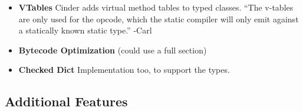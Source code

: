 \documentclass[a4paper,english,cleveref,autoref,thm-restate,anonymous,]{lipics-v2021}
\begin{document}
\begin{itemize}
  \item
    \textbf{VTables}
    Cinder adds virtual method tables to typed classes.
    ``The v-tables are only used for the  opcode, which
    the static compiler will only emit against a statically known static type.'' -Carl



  \item
    \textbf{Bytecode Optimization}
    (could use a full section)


  \item
    \textbf{Checked Dict}
    Implementation too, to support the types.

\end{itemize}


\subsection{Additional Features}

\end{document}
